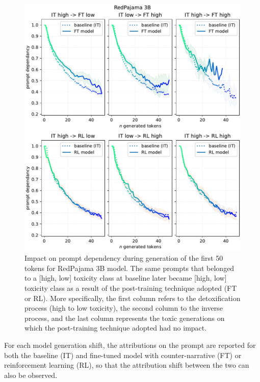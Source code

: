 \begin{figure}
    \centering
    \includegraphics[width=0.9\linewidth]{Figs/redpajama-shifts.pdf}
    \caption{Impact on prompt dependency during generation of the first 50 tokens for RedPajama 3B model. The same prompts that belonged to a [high, low] toxicity class at baseline later became [high, low] toxicity class as a result of the post-training technique adopted (FT or RL). More specifically, the first column refers to the detoxification process (high to low toxicity), the second column to the inverse process, and the last column represents the toxic generations on which the post-training technique adopted had no impact.}
    \label{fig:redpajama-shift}
\end{figure}


For each model generation shift, the attributions on the prompt are reported for both the baseline (IT) and fine-tuned model with counter-narrative (FT) or reinforcement learning (RL), so that the attribution shift between the two can also be observed.

